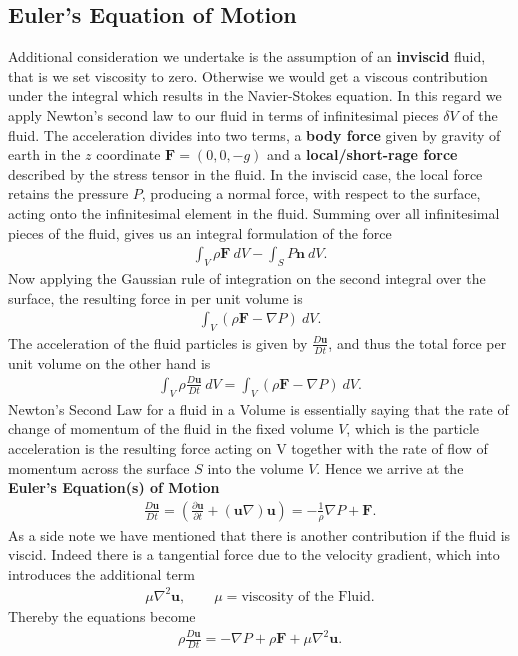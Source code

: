 \subsection{Euler's Equation of Motion}
Additional consideration we undertake is the assumption of an
\textbf{inviscid} fluid, that is we set viscosity to zero. Otherwise we would
get a viscous contribution under the integral which results in the
Navier-Stokes equation. In this regard we apply Newton's second law to our
fluid in terms of infinitesimal pieces $\delta V$ of the fluid. The
acceleration divides into two terms, a \textbf{body force} given by gravity
of earth in the $z$ coordinate $\mathbf{F} = (0, 0, -g)$ and a
\textbf{local/short-rage force} described by the stress tensor in the fluid.
In the inviscid case, the local force retains the pressure $P$, producing a
normal force, with respect to the surface, acting onto the infinitesimal
element in the fluid. Summing over all infinitesimal pieces of the fluid,
gives us an integral formulation of the force
\begin{align}
    \int_V \rho \mathbf{F}\ dV - \int_S P\mathbf{n}\ dV.
\end{align}
Now applying the Gaussian rule of integration on the second integral over the
surface, the resulting force in per unit volume is
\begin{align}
    \int_V \left(\rho \mathbf{F} - \nabla P\right)\ dV.
\end{align}
The acceleration of the fluid particles is given by $\frac{D\mathbf{u}}{Dt}$,
and thus the total force per unit volume on the other hand is
\begin{align}
    \int_V \rho \frac{D\mathbf{u}}{Dt}\ dV =
    \int_V \left(\rho \mathbf{F} - \nabla P\right)\ dV.
\end{align}
Newton's Second Law for a fluid in a Volume is essentially saying that the
rate of change of momentum of the fluid in the fixed volume $V$, which is the particle
acceleration is the resulting force acting on V together with the rate of
flow of momentum across the surface $S$ into the volume $V$. Hence we arrive
at the \textbf{Euler's Equation(s) of Motion}
\begin{align}
    \frac{D\mathbf{u}}{Dt} = \left(\frac{\partial \mathbf{u}}{\partial t}
    +(\mathbf{u}\nabla)\mathbf{u}\right)  =
    -\frac{1}{\rho}\nabla P + \mathbf{F}.
\end{align}
As a side note we have mentioned that there is another contribution if the
fluid is viscid. Indeed there is a tangential force due to the velocity
gradient, which into introduces the additional term
\begin{align}
    \mu \nabla^2 \mathbf{u}, \qquad
    \mu = \text{viscosity of the Fluid}.
\end{align}
Thereby the equations become
\begin{align}
    \rho\frac{D\mathbf{u}}{Dt}
    =  -\nabla P + \rho \mathbf{F} + \mu \nabla^2 \mathbf{u}.
\end{align}

